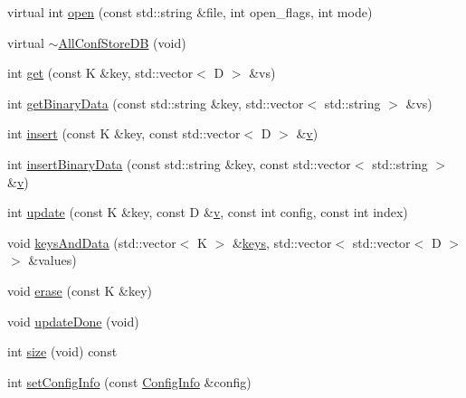 \begin{DoxyCompactItemize}
virtual int \mbox{\hyperlink{classFILEDB_1_1AllConfStoreDB_aa6e6deb3c33076d16db4ac0560f0d75f}{open}} (const std\+::string \&file, int open\+\_\+flags, int mode)
\item 
virtual \mbox{\hyperlink{classFILEDB_1_1AllConfStoreDB_ac5fe65eab60f20d7b8124c69c0bd5923}{$\sim$\+All\+Conf\+Store\+DB}} (void)
\item 
int \mbox{\hyperlink{classFILEDB_1_1AllConfStoreDB_a848466f7dce25cacc4e8560c50240d35}{get}} (const K \&key, std\+::vector$<$ D $>$ \&vs)
\item 
int \mbox{\hyperlink{classFILEDB_1_1AllConfStoreDB_aa923faf368f0aa7d327c2a3702d261c1}{get\+Binary\+Data}} (const std\+::string \&key, std\+::vector$<$ std\+::string $>$ \&vs)
\item 
int \mbox{\hyperlink{classFILEDB_1_1AllConfStoreDB_abf4a1ccd7306de436ba1ec61b242e02f}{insert}} (const K \&key, const std\+::vector$<$ D $>$ \&\mbox{\hyperlink{adat__devel_2lib_2hadron_2hadron__timeslice_8cc_a716fc87f5e814be3ceee2405ed6ff22a}{v}})
\item 
int \mbox{\hyperlink{classFILEDB_1_1AllConfStoreDB_ac2c898624d4b32c526951edfb6271d60}{insert\+Binary\+Data}} (const std\+::string \&key, const std\+::vector$<$ std\+::string $>$ \&\mbox{\hyperlink{adat__devel_2lib_2hadron_2hadron__timeslice_8cc_a716fc87f5e814be3ceee2405ed6ff22a}{v}})
\item 
int \mbox{\hyperlink{classFILEDB_1_1AllConfStoreDB_a3beaa117f0ddf32de13d5f96643b626c}{update}} (const K \&key, const D \&\mbox{\hyperlink{adat__devel_2lib_2hadron_2hadron__timeslice_8cc_a716fc87f5e814be3ceee2405ed6ff22a}{v}}, const int config, const int index)
\item 
void \mbox{\hyperlink{classFILEDB_1_1AllConfStoreDB_a9150983c712d6b870a75886f92b10a9d}{keys\+And\+Data}} (std\+::vector$<$ K $>$ \&\mbox{\hyperlink{classFILEDB_1_1ConfDataStoreDB_a794e05e3888ab95e0396a196b5a18e65}{keys}}, std\+::vector$<$ std\+::vector$<$ D $>$ $>$ \&values)
\item 
void \mbox{\hyperlink{classFILEDB_1_1AllConfStoreDB_afb092d33f9ca14ca30918d6cb8251fdb}{erase}} (const K \&key)
\item 
void \mbox{\hyperlink{classFILEDB_1_1AllConfStoreDB_ac90e596f6c914145130719ec5ac13593}{update\+Done}} (void)
\item 
int \mbox{\hyperlink{classFILEDB_1_1AllConfStoreDB_a78dd830c5211b3b00b8eae6170ffc9d6}{size}} (void) const
\item 
int \mbox{\hyperlink{classFILEDB_1_1AllConfStoreDB_a2062f555d190a3c52cc942447a090b8a}{set\+Config\+Info}} (const \mbox{\hyperlink{classFILEDB_1_1ConfigInfo}{Config\+Info}} \&config)

\end{DoxyCompactItemize}
